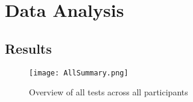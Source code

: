 \chapter{Data Analysis} \label{DataAnalysis}

\section{Results}
\begin{figure}[H]
    \centering
    \texttt{[image: AllSummary.png]}
    \caption{Overview of all tests across all participants}
    \label{fig:AllSummary}
\end{figure}

